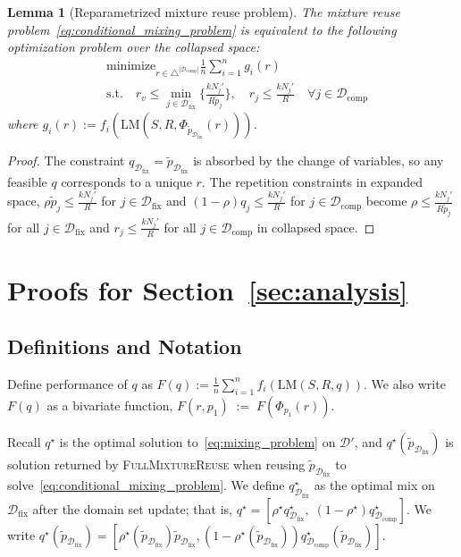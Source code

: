 \documentclass[table]{ai2style/ai2}
\newtheorem{lemma}{Lemma}
\newcommand{\D}[0]{\mathcal{D}}
\newcommand{\LM}[0]{\text{LM}}
\newcommand{\Dfix}[0]{\mathcal{D}_{\text{fix}}}
\newcommand{\Dcomp}[0]{\mathcal{D}_{\text{comp}}}
\newcommand{\fullmixreuse}[0]{\textsc{FullMixtureReuse}\xspace}
\begin{document}
\begin{lemma}[Reparametrized mixture reuse problem]\label{lem:collapsed_space}
The mixture reuse problem~\eqref{eq:conditional_mixing_problem} is equivalent to the following optimization problem over the collapsed space:
\begin{align}
    &\text{minimize}_{r \in \triangle^{|\Dcomp|}}  \frac{1}{n} \sum_{i = 1}^n g_i(r) \\
    &\text{s.t.} \quad r_v \le \min_{j \in \Dfix}\bigg\{\frac{k N_j'}{R \tilde{p}_{j}} \bigg\}, \quad r_j \le \frac{k N_j'}{R} \quad \forall j \in \Dcomp \nonumber
\end{align}
where $g_i(r) := f_i(\LM(S, R, \Phi_{\tilde{p}_{\Dfix}}(r)))$.
\end{lemma}
\begin{proof}
The constraint $q_{\Dfix} = \tilde{p}_{\Dfix}$ is absorbed by the change of variables, so any feasible $q$ corresponds to a unique $r$. The repetition constraints in expanded space, $\rho \tilde{p}_{j} \le \frac{k N_j'}{R}$ for $j \in \Dfix$ and $(1 - \rho) q_j \le \frac{k N_j'}{R}$ for $j \in \Dcomp$ become $\rho \le \frac{k N_j'}{R \tilde{p}_j}$ for all $j \in \Dfix$ and $r_j \le \frac{kN_j'}{R}$ for all $j \in \Dcomp$ in collapsed space.
\end{proof}

\section{Proofs for Section~\ref{sec:analysis}}\label{supp:proofs}

\subsection{Definitions and Notation}\label{supp:defs}
Define performance of $q$ as $F(q) := \frac{1}{n}\sum_{i=1}^n f_i(\LM(S,R,q))$. We also write $F(q)$ as a bivariate function, $F(r,p_1) \;:=\; F(\Phi_{p_1}(r))$. 

Recall $q^\star$ is the optimal solution to~\eqref{eq:mixing_problem} on $\D'$, and $q^\star(\tilde p_{\Dfix})$ is solution returned by \fullmixreuse when reusing $\tilde p_{\Dfix}$ to solve~\eqref{eq:conditional_mixing_problem}. We define $q^\star_{\Dfix}$ as the optimal mix on $\Dfix$ after the domain set update; that is, $q^\star = [\rho^\star q^\star_{\Dfix},\; (1-\rho^\star)q^\star_{\Dcomp}]$. We write $q^\star(\tilde p_{\Dfix}) = [\rho^\star(\tilde p_{\Dfix}) \tilde p_{\Dfix}, (1 - \rho^\star(\tilde p_{\Dfix})) q_{\Dcomp}^\star(\tilde p_{\Dfix})]$.
\end{document}
